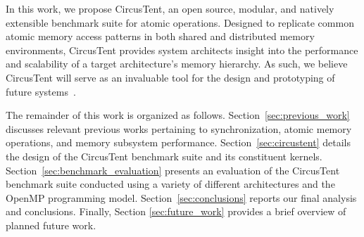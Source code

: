 In this work, we propose CircusTent, an open source, modular, and natively extensible benchmark suite for atomic operations.
Designed to replicate common atomic memory access patterns in both shared and distributed memory environments, CircusTent provides system architects insight into the performance and scalability of a target architecture's memory hierarchy.
As such, we believe CircusTent will serve as an invaluable tool for the design and prototyping of future systems~\cite{ctrepo}.

The remainder of this work is organized as follows.
Section~\ref{sec:previous_work} discusses relevant previous works pertaining to synchronization, atomic memory operations, and memory subsystem performance.
Section~\ref{sec:circustent} details the design of the CircusTent benchmark suite and its constituent kernels.
Section~\ref{sec:benchmark_evaluation} presents an evaluation of the CircusTent benchmark suite conducted using a variety of different architectures and the OpenMP programming model.
Section~\ref{sec:conclusions} reports our final analysis and conclusions.
Finally, Section \ref{sec:future_work} provides a brief overview of planned future work.